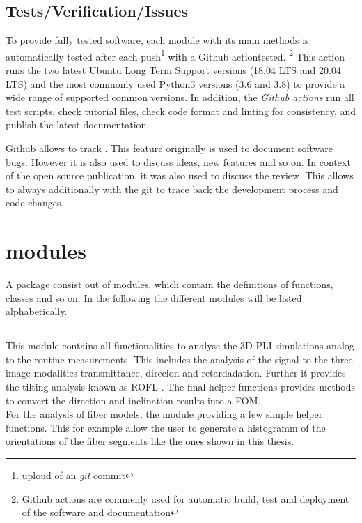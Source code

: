 \subsection{Tests/Verification/Issues}
%
To provide fully tested software, each module with its main methods is automatically tested after each push\footnote{uploud of an \textit{git} commit} with a Github actiontested. \footnote{Github actions are commenly used for automatic build, test and deployment of the software and documentation}
This action runs the two latest Ubuntu Long Term Support versions (18.04 LTS and 20.04 LTS) and the most commonly used Python3 versions (3.6 and 3.8) to provide a wide range of supported common versions.
In addition, the \textit{Github actions} run all test scripts, check tutorial files, check code format and linting for consistency, and publish the latest documentation.
%
\par
%
Github allows to track .
This feature originally is used to document software bugs.
However it is also used to discuss ideas, new features and so on.
In context of the open source publication, it was also used to discuss the review.
This allows to always additionally with the git  to trace back the development process and code changes.
%
% 
%
% 
\section{modules}
%
A \python{} package consist out of modules, which contain the definitions of functions, classes and so on.
In the following the different modules will be listed alphabetically.
%
%
%
\subsection{}
%
This module contains all functionalities to analyse the \ac{3D-PLI} simulations analog to the routine measurements.
This includes the analysis of the signal to the three image modalities transmittance, direcion and retardadation.
Further it provides the tilting analysis known as \ac{ROFL} \cite{Schmitz2018}.
The final helper functions provides methods to convert the direction and inclination results into a \ac{FOM}.
\\
For the analysis of fiber models, the module providing a few simple helper functions.
This for example allow the user to generate a histogramm of the orientations of the fiber segments like the ones shown in this thesis.
%
